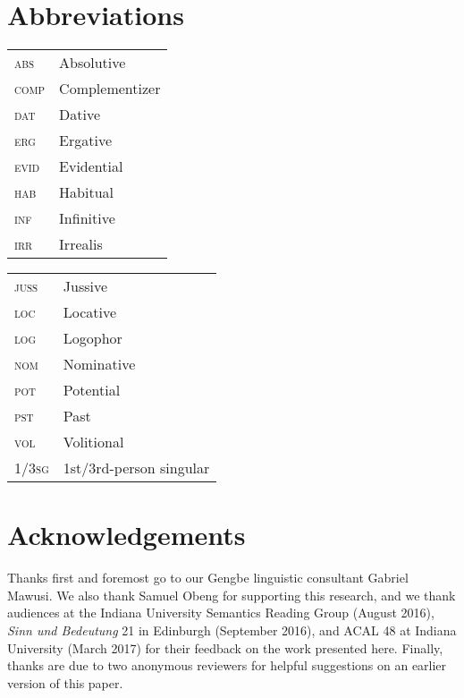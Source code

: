 \documentclass[output=paper,modfonts,nonflat]{langsci/langscibook}
\begin{document}
\section*{Abbreviations}


\begin{tabularx}{.45\textwidth}{l l}
    \textsc{abs} & Absolutive\\
    \textsc{comp} & Complementizer\\
    \textsc{dat} & Dative\\
    \textsc{erg} & Ergative\\
    \textsc{evid} & Evidential\\
    \textsc{hab} & Habitual\\
    \textsc{inf} & Infinitive\\
    \textsc{irr} & Irrealis\\
\end{tabularx}
\begin{tabularx}{.45\textwidth}{l l}
    \textsc{juss} & Jussive\\
    \textsc{loc} & Locative\\
    \textsc{log} & Logophor\\
    \textsc{nom} & Nominative\\
    \textsc{pot} & Potential\\
    \textsc{pst} & Past\\
    \textsc{vol} & Volitional\\
    1/3\textsc{sg} & 1st/3rd-person singular\\
\end{tabularx}

 
\section*{Acknowledgements}

Thanks first and foremost go to our Gengbe linguistic consultant Gabriel Mawusi. We also thank Samuel Obeng for supporting this research, and we thank audiences at the Indiana University Semantics Reading Group (August 2016), \emph{Sinn und Bedeutung} 21 in Edinburgh (September 2016), and ACAL 48 at Indiana University (March 2017) for their feedback on the work presented here. Finally, thanks are due to two anonymous reviewers for helpful suggestions on an earlier version of this paper.

\sloppy
\printbibliography[heading=subbibliography,notkeyword=this]
\end{document}
